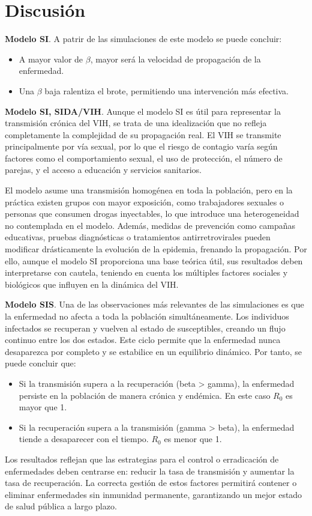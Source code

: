 \section{Discusión}
\textbf{Modelo SI}.
A patrir de las simulaciones de este modelo se puede concluir:
\begin{itemize}
    \item A mayor valor de $\beta$, mayor será la velocidad de propagación de la enfermedad.
    \item Una $\beta$ baja ralentiza el brote, permitiendo una intervención más efectiva.
\end{itemize}

\vspace{2em} 

\textbf{Modelo SI, SIDA/VIH}. Aunque el modelo SI es útil para representar la transmisión crónica del VIH, se trata de una idealización que no refleja completamente la complejidad de su propagación real. El VIH se transmite principalmente por vía sexual, por lo que el riesgo de contagio varía según factores como el comportamiento sexual, el uso de protección, el número de parejas, y el acceso a educación y servicios sanitarios.

El modelo asume una transmisión homogénea en toda la población, pero en la práctica existen grupos con mayor exposición, como trabajadores sexuales o personas que consumen drogas inyectables, lo que introduce una heterogeneidad no contemplada en el modelo.
Además, medidas de prevención como campañas educativas, pruebas diagnósticas o tratamientos antirretrovirales pueden modificar drásticamente la evolución de la epidemia, frenando la propagación. Por ello, aunque el modelo SI proporciona una base teórica útil, sus resultados deben interpretarse con cautela, teniendo en cuenta los múltiples factores sociales y biológicos que influyen en la dinámica del VIH.


\vspace{2em}

\textbf{Modelo SIS}.
Una de las observaciones más relevantes de las simulaciones es que la enfermedad no afecta a toda la población simultáneamente. Los individuos infectados se recuperan y vuelven al estado de susceptibles, creando un flujo continuo entre los dos estados. Este ciclo permite que la enfermedad nunca desaparezca por completo y se estabilice en un equilibrio dinámico.
Por tanto, se puede concluir que:
\begin{itemize}
    \item Si la transmisión supera a la recuperación (beta > gamma), la enfermedad persiste en la población de manera crónica y endémica. En este caso $R_0$ es mayor que 1.
    \item Si la recuperación supera a la transmisión (gamma > beta), la enfermedad tiende a desaparecer con el tiempo. $R_0$ es menor que 1.
\end{itemize}	
Los resultados reflejan que las estrategias para el control o erradicación de enfermedades deben centrarse en: reducir la tasa de transmisión y aumentar la tasa de recuperación. La correcta gestión de estos factores permitirá contener o eliminar enfermedades sin inmunidad permanente, garantizando un mejor estado de salud pública a largo plazo.

